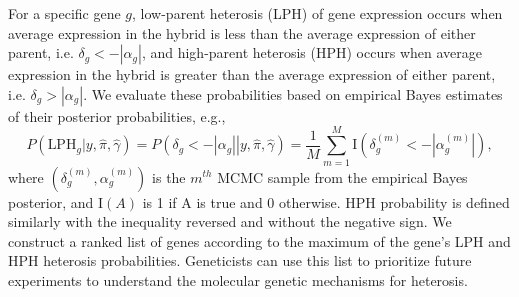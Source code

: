 \documentclass[useAMS,usenatbib,referee]{biom}
\begin{document}
For a specific gene $g$, low-parent heterosis (LPH) of gene expression occurs when average expression in the hybrid is less than the average expression of either parent, i.e. $\delta_g < -|\alpha_g|$, and high-parent heterosis (HPH) occurs when average expression in the hybrid is greater than the average expression of either parent, i.e. $\delta_g > |\alpha_g|$. 
We evaluate these probabilities based on empirical Bayes estimates of their posterior probabilities, e.g., 
\begin{equation}
P(\mbox{LPH}_g|y,\hat{\pi},\hat{\gamma}) = P\left(\left.\delta_g < -|\alpha_g|\right|y, \hat{\pi},\hat{\gamma}\right) = \frac{1}{M} \sum_{m=1}^M \mathrm{I}\left(\delta_g^{(m)} < -\left|\alpha_g^{(m)}\right|\right), 
\label{e:probs}
\end{equation}
where $\left(\delta_g^{(m)},\alpha_g^{(m)}\right)$ is the $m^{th}$ MCMC sample from the empirical Bayes posterior, and $\mathrm{I}(A)$ is 1 if A is true and 0 otherwise. HPH probability is defined similarly with the inequality reversed and without the negative sign. We construct a ranked list of genes according to the maximum of the gene's LPH and HPH heterosis probabilities. Geneticists can use this list to prioritize future experiments to understand the molecular genetic mechanisms for heterosis.  
 
\end{document}
